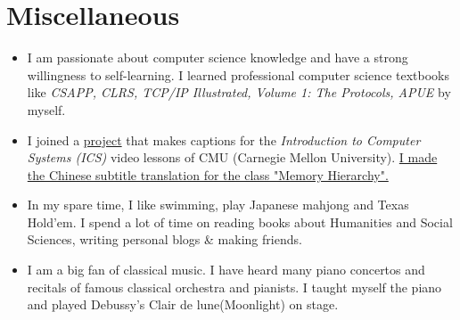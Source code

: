 \documentclass{resume}
\begin{document}
\section{Miscellaneous}
\begin{itemize}[parsep=0.5ex]
  \item I am passionate about computer science knowledge and have a strong willingness to self-learning. I learned professional computer science textbooks like \textit{CSAPP, CLRS, TCP/IP Illustrated, Volume 1: The Protocols, APUE} by myself.
  \item I joined a \href{https://github.com/EugeneLiu/translationCSAPP/commit/b90a9547a259420e0c21fa4ca73ca1e1619deb63}{project} that makes captions for the \textit{Introduction to Computer Systems (ICS)} video lessons of CMU (Carnegie Mellon University). \href{https://www.bilibili.com/video/BV1iW411d7hd?p=11}{I made the Chinese subtitle translation for the class "Memory Hierarchy".}
  \item In my spare time, I like swimming, play Japanese mahjong and Texas Hold'em. I spend a lot of time on reading books about Humanities and Social Sciences, writing personal blogs \& making friends.
  \item I am a big fan of classical music. I have heard many piano concertos and recitals of famous classical orchestra and pianists. I taught myself the piano and played Debussy's Clair de lune(Moonlight) on stage.
\end{itemize}

%
%
\end{document}
